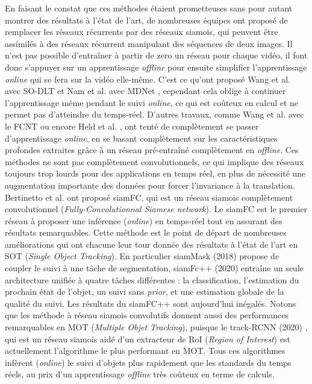 \documentclass[10pt,twocolumn,letterpaper,french]{article}
\begin{document}
En faisant le constat que ces méthodes étaient prometteuses sans pour autant montrer des résultats à l'état de l'art, de nombreuses équipes ont proposé de remplacer les réseaux récurrents par des réseaux siamois, qui peuvent être assimilés à des réseaux récurrent manipulant des séquences de deux images. Il n'est pas possible d’entraîner à partir de zero un réseau pour chaque vidéo, il font donc s'appuyer sur un apprentissage \textit{offline} pour ensuite simplifier l'apprentissage \textit{online} qui se fera sur la vidéo elle-même. C'est ce qu'ont proposé Wang et al. avec SO-DLT \cite{wang2015transferring} et Nam et al. avec MDNet \cite{nam2016learning}, cependant cela oblige à continuer l'apprentissage même pendant le suivi \textit{online}, ce qui est coûteux en calcul et ne permet pas d'atteindre du temps-réel. D'autres travaux, comme Wang et al. avec le FCNT \cite{Wang} ou encore Held et al. \cite{held2016learning}, ont tenté de complètement se passer d'apprentissage \textit{online}, en se basant complètement sur les caractéristiques profondes extraites grâce à un réseau pré-entraîné complètement en \textit{offline}. Ces méthodes ne sont pas complètement convolutionnels, ce qui implique des réseaux toujours trop lourds pour des applications en temps réel, en plus de nécessité une augmentation importante des données pour forcer l'invariance à la translation. Bertinetto et al. \cite{siamfc} ont proposé siamFC, qui est un réseau siamois complètement convolutionnel (\textit{Fully-Convolutionnal Siamese network}). Le siamFC est le premier réseau à proposer une inférence (\textit{online}) en temps-réel tout en assurant des résultats remarquables. Cette méthode est le point de départ de nombreuses améliorations qui ont chacune leur tour donnée des résultats à l'état de l'art en SOT (\textit{Single Object Tracking}). En particulier  siamMask (2018) \cite{siamMask}  propose de coupler le suivi à une tâche de segmentation, siamFc++ (2020) \cite{siamfcplusplus}  entraîne un seule architecture unifiée à quatre tâches différentes : la classification, l'estimation du prochain état de l'objet, un suivi sans \textit{prior}, et une estimation globale de la qualité du suivi. Les résultats du siamFC++ sont aujourd'hui inégalés. Notons que les méthode à réseau siamois convolutifs donnent aussi des performances remarquables en MOT (\textit{Multiple Objet Tracking}), puisque le track-RCNN (2020)  \cite{trackRCNN}, qui est un réseau siamois aidé d'un extracteur de RoI (\textit{Region of Interest}) est actuellement l'algorithme le plus performant en MOT. Tous ces algorithmes infèrent (\textit{online}) le suivi d'objets plus rapidement que les standards du temps réels, au prix d'un apprentissage \textit{offline} très coûteux en terme de calculs.
\end{document}
